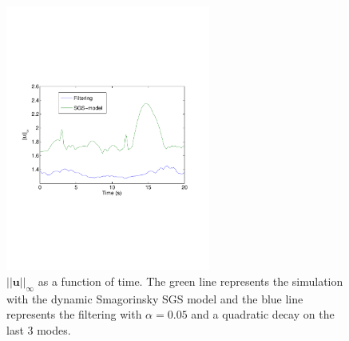 %
\begin{figure}[h]
	\centering
	\includegraphics[trim=0.5cm 7cm 0.5cm 7cm, width=0.6\textwidth]{Figures/maxvel.pdf}
    \caption{$||\mathbf{u}||_{\infty}$ as a function of time. The green line represents the 
simulation with the dynamic Smagorinsky SGS model and the blue line represents the filtering 
with $\alpha = 0.05$ and a quadratic decay on the last 3 modes.}
	\label{fig:maxvel}
\end{figure}
%
%
%
%
%

